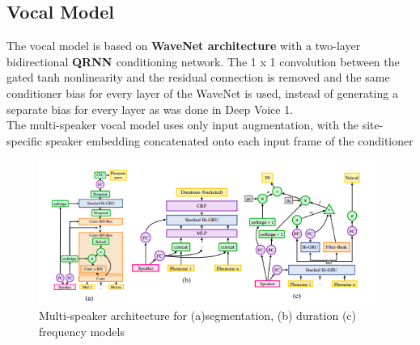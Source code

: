 \documentclass[twosided]{article}
\begin{document}
\subsection*{Vocal Model}
The vocal model is based on \textbf{WaveNet architecture} with a two-layer bidirectional \textbf{QRNN \cite{QRNN}} conditioning network. The  1 x 1 convolution between the gated tanh nonlinearity and the residual connection is removed and the same conditioner bias for every layer of the WaveNet is used, instead of generating a separate bias for every layer as was done in Deep Voice 1.\\
The multi-speaker vocal model uses only input augmentation, with the site-specific speaker embedding concatenated onto each input frame of the conditioner

\begin{figure}[h]
    \centering
    \includegraphics[width=\textwidth]{images/Figure2.png}
    \caption{Multi-speaker architecture for (a)segmentation,  (b) duration (c) frequency models}
    \label{fig:figure2}
\end{figure}
\end{document}
